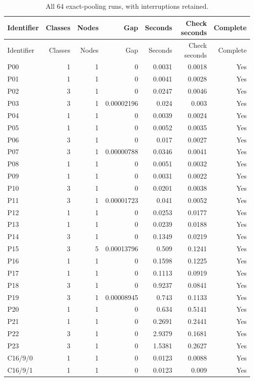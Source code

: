\begin{longtable}{lrrrrrr}
\caption{All 64 exact-pooling runs, with interruptions retained.}\label{tab:r49-all}\\
\toprule
Identifier & Classes & Nodes & Gap & Seconds & Check seconds & Complete \\
\midrule\endfirsthead
\toprule
Identifier & Classes & Nodes & Gap & Seconds & Check seconds & Complete \\
\midrule\endhead
P00 & 1 & 1 & 0 & 0.0031 & 0.0018 & Yes \\
P01 & 1 & 1 & 0 & 0.0041 & 0.0028 & Yes \\
P02 & 3 & 1 & 0 & 0.0247 & 0.0046 & Yes \\
P03 & 3 & 1 & 0.00002196 & 0.024 & 0.003 & Yes \\
P04 & 1 & 1 & 0 & 0.0039 & 0.0024 & Yes \\
P05 & 1 & 1 & 0 & 0.0052 & 0.0035 & Yes \\
P06 & 3 & 1 & 0 & 0.017 & 0.0027 & Yes \\
P07 & 3 & 1 & 0.00000788 & 0.0346 & 0.0041 & Yes \\
P08 & 1 & 1 & 0 & 0.0051 & 0.0032 & Yes \\
P09 & 1 & 1 & 0 & 0.0031 & 0.0022 & Yes \\
P10 & 3 & 1 & 0 & 0.0201 & 0.0038 & Yes \\
P11 & 3 & 1 & 0.00001723 & 0.041 & 0.0052 & Yes \\
P12 & 1 & 1 & 0 & 0.0253 & 0.0177 & Yes \\
P13 & 1 & 1 & 0 & 0.0239 & 0.0188 & Yes \\
P14 & 3 & 1 & 0 & 0.1349 & 0.0219 & Yes \\
P15 & 3 & 5 & 0.00013796 & 0.509 & 0.1241 & Yes \\
P16 & 1 & 1 & 0 & 0.1598 & 0.1225 & Yes \\
P17 & 1 & 1 & 0 & 0.1113 & 0.0919 & Yes \\
P18 & 3 & 1 & 0 & 0.9237 & 0.0841 & Yes \\
P19 & 3 & 1 & 0.00008945 & 0.743 & 0.1133 & Yes \\
P20 & 1 & 1 & 0 & 0.634 & 0.5141 & Yes \\
P21 & 1 & 1 & 0 & 0.2691 & 0.2441 & Yes \\
P22 & 3 & 1 & 0 & 2.9379 & 0.1681 & Yes \\
P23 & 3 & 1 & 0 & 1.5381 & 0.2627 & Yes \\
C16/9/0 & 1 & 1 & 0 & 0.0123 & 0.0088 & Yes \\
C16/9/1 & 1 & 1 & 0 & 0.0123 & 0.009 & Yes \\

\end{longtable}
